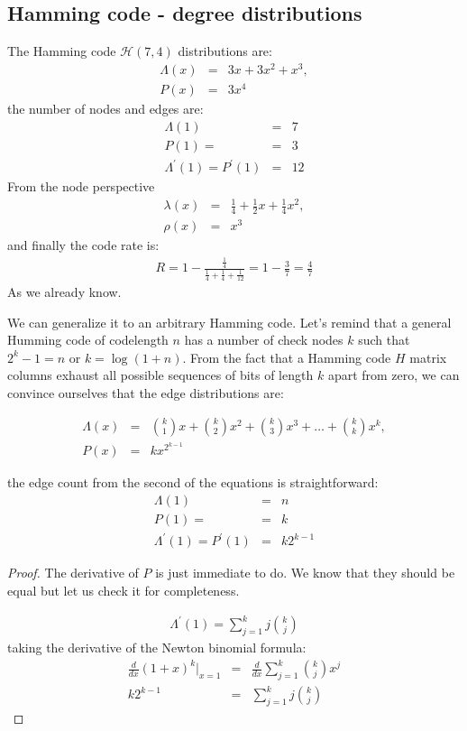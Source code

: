 \subsection{Hamming code - degree distributions}
The Hamming code $\mathcal{H}(7,4)$ distributions are:
\begin{eqnarray}
	\Lambda(x) &=& 3x+3x^2+x^3, \\
	P(x) &=& 3x^4
\end{eqnarray}
the number of nodes and edges are: 
\begin{eqnarray}
 	\Lambda(1) &=& 7 \\
 	P(1) = &=& 3 \\
 	\Lambda^\prime(1) = P^\prime(1) &=& 12
\end{eqnarray}
From the node perspective
\begin{eqnarray}
\lambda(x) &=& \frac{1}{4}+\frac{1}{2}x+\frac{1}{4}x^2, \\
\rho(x) &=& x^3
\end{eqnarray}
and finally the code rate is:
\begin{eqnarray}
R = 1 - \frac{\frac{1}{4}}{\frac{1}{4} + \frac{1}{4} + \frac{1}{12}} = 1 - \frac{3}{7} = \frac{4}{7}
\end{eqnarray}
As we already know. 

We can generalize it to an arbitrary Hamming code. Let's remind that a general Humming code of codelength $n$ has a number of check nodes $k$ such that $2^k-1 = n$ or $k=\log(1+n)$. From the fact that a Hamming code $H$ matrix columns exhaust all possible sequences of bits of length $k$ apart from zero, we can convince ourselves that the edge distributions are:

\begin{eqnarray}
\Lambda(x) &=& \binom{k}{1}x+\binom{k}{2}x^2+\binom{k}{3}x^3 + \dots + \binom{k}{k}x^k, \\
P(x) &=& kx^{2^{k-1}}
\end{eqnarray}

the edge count from the second of the equations is straightforward: 
\begin{eqnarray}
\Lambda(1) &=& n \\
P(1) = &=& k \\
\Lambda^\prime(1) = P^\prime(1) &=& k2^{k-1} \label{eq:hammingexedgecount}
\end{eqnarray}

\begin{proof}
The derivative of $P$ is just immediate to do. We know that they should be equal but let us check it for completeness.

\begin{eqnarray}
	 \Lambda^\prime(1) = \sum_{j=1}^{k} j\binom{k}{j}
\end{eqnarray}
taking the derivative of the Newton binomial formula:
\begin{eqnarray}
\frac{d}{dx}(1+x)^k|_{x=1} &=& \frac{d}{dx}\sum_{j=1}^{k}\binom{k}{j}x^j \\
k2^{k-1} &=& \sum_{j=1}^{k} j\binom{k}{j} 
\end{eqnarray}
\end{proof}

